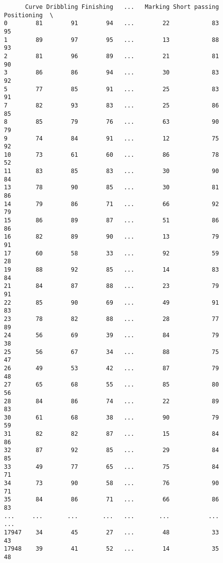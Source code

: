 \documentclass[11pt]{article}
\begin{document}
\begin{verbatim}
      Curve Dribbling Finishing   ...   Marking Short passing Positioning  \
0        81        91        94   ...        22            83          95   
1        89        97        95   ...        13            88          93   
2        81        96        89   ...        21            81          90   
3        86        86        94   ...        30            83          92   
5        77        85        91   ...        25            83          91   
7        82        93        83   ...        25            86          85   
8        85        79        76   ...        63            90          79   
9        74        84        91   ...        12            75          92   
10       73        61        60   ...        86            78          52   
11       83        85        83   ...        30            90          84   
13       78        90        85   ...        30            81          86   
14       79        86        71   ...        66            92          79   
15       86        89        87   ...        51            86          86   
16       82        89        90   ...        13            79          91   
17       60        58        33   ...        92            59          28   
19       88        92        85   ...        14            83          84   
21       84        87        88   ...        23            79          91   
22       85        90        69   ...        49            91          83   
23       78        82        88   ...        28            77          89   
24       56        69        39   ...        84            79          38   
25       56        67        34   ...        88            75          47   
26       49        53        42   ...        87            79          48   
27       65        68        55   ...        85            80          56   
28       84        86        74   ...        22            89          83   
30       61        68        38   ...        90            79          59   
31       82        82        87   ...        15            84          86   
32       87        92        85   ...        29            84          85   
33       49        77        65   ...        75            84          71   
34       73        90        58   ...        76            90          71   
35       84        86        71   ...        66            86          83   
...     ...       ...       ...   ...       ...           ...         ...   
17947    34        45        27   ...        48            33          43   
17948    39        41        52   ...        14            35          48   

\end{verbatim}
\end{document}
